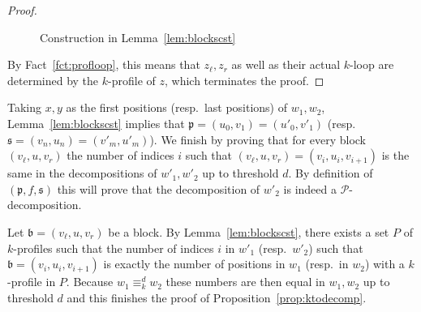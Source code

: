 \documentclass{LMCS}
\newcommand\Ps{\ensuremath{\mathcal{P}}\xspace}
\newcommand\kloop{$k$-loop\xspace}
\newcommand\profile[1]{$#1$-profile\xspace}
\newcommand\profiles[1]{$#1$-profiles\xspace}
\newcommand\kprofile{\profile{k}}
\newcommand\kprofiles{\profiles{k}}
\newcommand\ltteq[2]{\ensuremath{\equiv_{#1}^{#2}}\xspace}
\newcommand\kdltteq{\ltteq{k}{d}}
\newcommand\decop[1]{\ensuremath{#1}-decomposition\xspace}
\newcommand\pfsdecomp{\decop{\Ps}}
\newcommand\frb{\ensuremath{\mathfrak{b}}\xspace}
\newcommand\frp{\ensuremath{\mathfrak{p}}\xspace}
\newcommand\frs{\ensuremath{\mathfrak{s}}\xspace}
\theoremstyle{plain}
\begin{document}
\begin{proof}
\begin{figure}[h]
\begin{center}
    \end{center}
    \caption{Construction in Lemma~\ref{lem:blockscst}}
    \label{fig:profile}
  \end{figure}
  By Fact~\ref{fct:profloop}, this means that $z_\ell,z_r$ as well as
  their actual \kloop are determined by the \kprofile of $z$, which
  terminates the proof.
\end{proof}

Taking $x,y$ as the first positions (resp.~last positions) of
$w_1,w_2$, Lemma~\ref{lem:blockscst} implies that $\frp = (u_0,v_1) =
(u'_0,v'_1)$ (resp.~$\frs = (v_n,u_n) = (v'_m,u'_m)$). We finish by
proving that for every block $(v_\ell,u,v_r)$ the number of indices
$i$ such that $(v_\ell,u,v_r)=(v_i,u_i,v_{i+1})$ is the same in the
decompositions of $w'_1,w'_2$ up to threshold $d$. By definition of
$(\frp,f,\frs)$ this will prove that the decomposition of $w'_2$ is
indeed a \pfsdecomp.

Let $\frb=(v_\ell,u,v_r)$ be a block. By Lemma~\ref{lem:blockscst},
there exists a set $P$ of \kprofiles such that the number of indices $i$ in
$w' _1$ (resp.~$w'_2$) such that $\frb = (v_i,u_i,v_{i+1})$ is exactly
the number of positions in $w_1$ (resp.~in $w_2$) with a \kprofile in
$P$. Because $w_1 \kdltteq w_2$ these numbers are then equal in $w_1,
w_2$ up to threshold $d$ and this finishes the proof of Proposition~\ref{prop:ktodecomp}.
\end{document}
